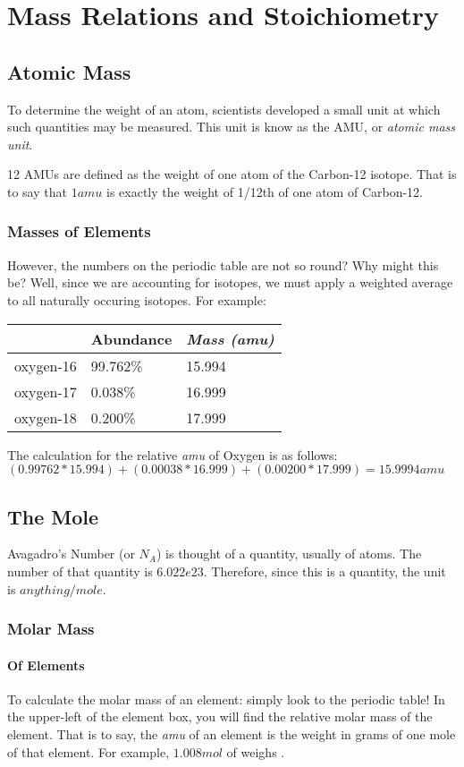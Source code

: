 \chapter{Mass Relations and Stoichiometry}
\section{Atomic Mass}
To determine the weight of an atom, scientists developed a small unit at which
such quantities may be measured.  This unit is know as the AMU, or
\textit{atomic mass unit}.

12 AMUs are defined as the weight of one atom of the Carbon-12 isotope.  That is
to say that $1amu$ is exactly the weight of 1/12th of one atom of Carbon-12.

\subsection{Masses of Elements}
However, the numbers on the periodic table are not so round?  Why might this be?
Well, since we are accounting for isotopes, we must apply a weighted average to
all naturally occuring isotopes.  For example:

\begin{table}[h]
\begin{tabular}{lll}
\hline
          & Abundance & \textit{Mass (amu)} \\ \hline
oxygen-16 & 99.762\%  & 15.994              \\
oxygen-17 & 0.038\%   & 16.999              \\
oxygen-18 & 0.200\%   & 17.999
\end{tabular}
\end{table}

The calculation for the relative \textit{amu} of Oxygen is as follows:
$(0.99762*15.994) + (0.00038*16.999) + (0.00200*17.999) = 15.9994amu$

\section{The Mole}
Avagadro's Number (or $N_A$) is thought of a quantity, usually of atoms.  The
number of that quantity is $6.022e23$.  Therefore, since this is a quantity, the
unit is $anything/mole$.

\subsection{Molar Mass}
\subsubsection{Of Elements}
To calculate the molar mass of an element: simply look to the periodic table!
In the upper-left of the element box, you will find the relative molar mass of
the element.  That is to say, the \textit{amu} of an element is the weight in
grams of one mole of that element.  For example, $1.008mol$ of  weighs
.

